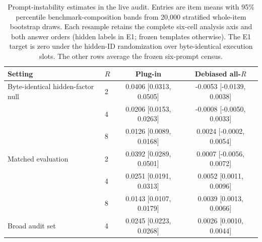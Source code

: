 \begin{table}[t]
\centering
\small
\setlength{\tabcolsep}{5pt}
\begin{tabular}{llcc}
\toprule
Setting & $R$ & Plug-in & Debiased all-$R$ \\
\midrule
Byte-identical hidden-factor null & 2 & 0.0406 [0.0313, 0.0505] & -0.0053 [-0.0139, 0.0038] \\
 & 4 & 0.0206 [0.0153, 0.0263] & -0.0008 [-0.0050, 0.0033] \\
 & 8 & 0.0126 [0.0089, 0.0168] & 0.0024 [-0.0002, 0.0054] \\
Matched evaluation & 2 & 0.0392 [0.0289, 0.0501] & 0.0007 [-0.0056, 0.0072] \\
 & 4 & 0.0251 [0.0191, 0.0313] & 0.0052 [0.0011, 0.0096] \\
 & 8 & 0.0143 [0.0107, 0.0179] & 0.0039 [0.0013, 0.0066] \\
Broad audit set & 4 & 0.0245 [0.0223, 0.0268] & 0.0026 [0.0010, 0.0044] \\
\bottomrule
\end{tabular}
\caption{Prompt-instability estimates in the live audit. Entries are item
means with 95\% percentile benchmark-composition bands from 20,000 stratified whole-item
bootstrap draws. Each resample retains the complete six-cell analysis axis and
both answer orders (hidden labels in E1; frozen templates otherwise). The E1
target is zero under the hidden-ID randomization over byte-identical execution
slots. The other rows average the frozen six-prompt census.}
\label{tab:real_prompt_estimates}
\end{table}
